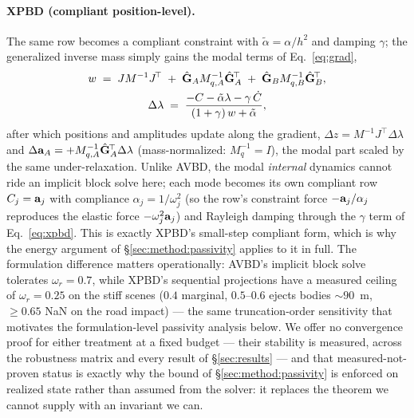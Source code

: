 \paragraph*{XPBD (compliant position-level).} The same row becomes a compliant
constraint with $\tilde\alpha=\alpha/h^2$ and damping $\gamma$; the generalized
inverse mass simply gains the modal terms of Eq.~\ref{eq:grad},
\begin{equation}
\begin{gathered}
  w \;=\; J M^{-1} J^{\!\top}
        \;+\; \hat{\mathbf{G}}_A M_{q,A}^{-1}\hat{\mathbf{G}}_A^{\!\top}
        \;+\; \hat{\mathbf{G}}_B M_{q,B}^{-1}\hat{\mathbf{G}}_B^{\!\top},\\
  \Delta\lambda \;=\; \frac{-C-\tilde\alpha\lambda-\gamma\,\dot C}
                            {(1+\gamma)\,w+\tilde\alpha},
\end{gathered}
  \label{eq:xpbd}
\end{equation}
after which positions and amplitudes update along the gradient,
$\Delta z = M^{-1}J^{\!\top}\Delta\lambda$ and
$\Delta\mathbf{a}_A=+M_{q,A}^{-1}\hat{\mathbf{G}}_A^{\!\top}\Delta\lambda$ (mass-normalized:
$M_q^{-1}=I$), the modal part scaled by the same under-relaxation. Unlike AVBD,
the modal \emph{internal} dynamics cannot ride an implicit block solve here; each
mode becomes its own compliant row $C_j=\mathbf{a}_j$ with compliance
$\alpha_j = 1/\omega_j^2$ (so the row's constraint force $-\mathbf{a}_j/\alpha_j$
reproduces the elastic force $-\omega_j^2\mathbf{a}_j$) and Rayleigh damping through the
$\gamma$ term of Eq.~\ref{eq:xpbd}. This is exactly XPBD's small-step compliant
form, which is why the energy argument of \S\ref{sec:method:passivity} applies to
it in full. The formulation difference matters operationally: AVBD's implicit
block solve tolerates $\omega_r=0.7$, while XPBD's sequential projections have a
measured ceiling of $\omega_r=0.25$ on the stiff scenes ($0.4$ marginal,
$0.5$--$0.6$ ejects bodies ${\sim}90$~m, ${\ge}0.65$ NaN on the road impact) ---
the same truncation-order sensitivity that motivates the formulation-level
passivity analysis below. We offer no convergence proof for either treatment
at a fixed budget --- their stability is measured, across the robustness
matrix and every result of \S\ref{sec:results} --- and that measured-not-proven
status is exactly why the bound of \S\ref{sec:method:passivity} is enforced on
realized state rather than assumed from the solver: it replaces the theorem we
cannot supply with an invariant we can.

